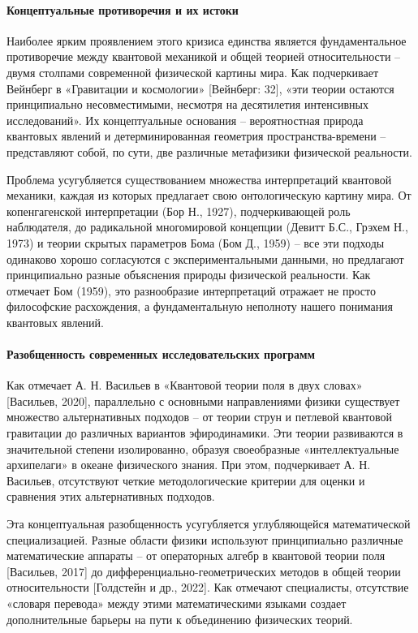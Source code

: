     \paragraph*{Концептуальные противоречия и их истоки}
    Наиболее ярким проявлением этого кризиса единства является фундаментальное противоречие между квантовой механикой и общей теорией относительности – двумя столпами современной физической картины мира. Как подчеркивает Вейнберг в «Гравитации и космологии» [Вейнберг: 32], «эти теории остаются принципиально несовместимыми, несмотря на десятилетия интенсивных исследований». Их концептуальные основания – вероятностная природа квантовых явлений и детерминированная геометрия пространства-времени – представляют собой, по сути, две различные метафизики физической реальности.

    Проблема усугубляется существованием множества интерпретаций квантовой механики, каждая из которых предлагает свою онтологическую картину мира. От копенгагенской интерпретации (Бор Н., 1927), подчеркивающей роль наблюдателя, до радикальной многомировой концепции (Девитт Б.С., Грэхем Н., 1973) и теории скрытых параметров Бома (Бом Д., 1959) – все эти подходы одинаково хорошо согласуются с экспериментальными данными, но предлагают принципиально разные объяснения природы физической реальности. Как отмечает Бом (1959), это разнообразие интерпретаций отражает не просто философские расхождения, а фундаментальную неполноту нашего понимания квантовых явлений.

    \paragraph*{Разобщенность современных исследовательских программ}
    Как отмечает А. Н. Васильев в «Квантовой теории поля в двух словах» [Васильев, 2020], параллельно с основными направлениями физики существует множество альтернативных подходов – от теории струн и петлевой квантовой гравитации до различных вариантов эфиродинамики. Эти теории развиваются в значительной степени изолированно, образуя своеобразные «интеллектуальные архипелаги» в океане физического знания. При этом, подчеркивает А. Н. Васильев, отсутствуют четкие методологические критерии для оценки и сравнения этих альтернативных подходов.

    Эта концептуальная разобщенность усугубляется углубляющейся математической специализацией. Разные области физики используют принципиально различные математические аппараты – от операторных алгебр в квантовой теории поля [Васильев, 2017] до дифференциально-геометрических методов в общей теории относительности [Голдстейн и др., 2022]. Как отмечают специалисты, отсутствие «словаря перевода» между этими математическими языками создает дополнительные барьеры на пути к объединению физических теорий.

